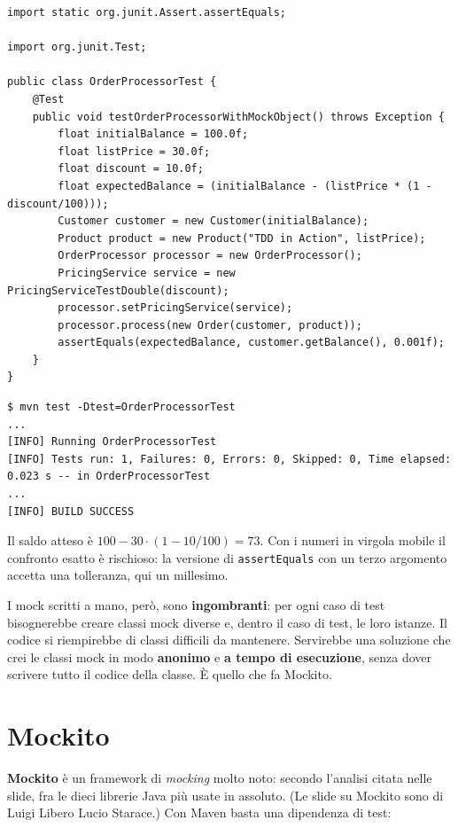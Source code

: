 \begin{lstlisting}[style=java, name=OrderProcessorTest.java]
import static org.junit.Assert.assertEquals;

import org.junit.Test;

public class OrderProcessorTest {
    @Test
    public void testOrderProcessorWithMockObject() throws Exception {
        float initialBalance = 100.0f;
        float listPrice = 30.0f;
        float discount = 10.0f;
        float expectedBalance = (initialBalance - (listPrice * (1 - discount/100)));
        Customer customer = new Customer(initialBalance);
        Product product = new Product("TDD in Action", listPrice);
        OrderProcessor processor = new OrderProcessor();
        PricingService service = new PricingServiceTestDouble(discount);
        processor.setPricingService(service);
        processor.process(new Order(customer, product));
        assertEquals(expectedBalance, customer.getBalance(), 0.001f);
    }
}
\end{lstlisting}

\begin{lstlisting}[style=shell, name=Terminale]
$ mvn test -Dtest=OrderProcessorTest
...
[INFO] Running OrderProcessorTest
[INFO] Tests run: 1, Failures: 0, Errors: 0, Skipped: 0, Time elapsed: 0.023 s -- in OrderProcessorTest
...
[INFO] BUILD SUCCESS
\end{lstlisting}

Il saldo atteso è $100 - 30 \cdot (1 - 10/100) = 73$. Con i numeri in virgola mobile il confronto esatto è rischioso:
la versione di \texttt{assertEquals} con un terzo argomento accetta una tolleranza, qui un millesimo.

I mock scritti a mano, però, sono \textbf{ingombranti}: per ogni caso di test bisognerebbe creare classi mock diverse e,
dentro il caso di test, le loro istanze. Il codice si riempirebbe di classi difficili da mantenere. Servirebbe una
soluzione che crei le classi mock in modo \textbf{anonimo} e \textbf{a tempo di esecuzione}, senza dover scrivere tutto
il codice della classe. È quello che fa Mockito.

\section{Mockito}

\textbf{Mockito} è un framework di \textit{mocking} molto noto: secondo l'analisi citata nelle slide, fra le dieci
librerie Java più usate in assoluto. (Le slide su Mockito sono di Luigi Libero Lucio Starace.) Con Maven basta una
dipendenza di test:


